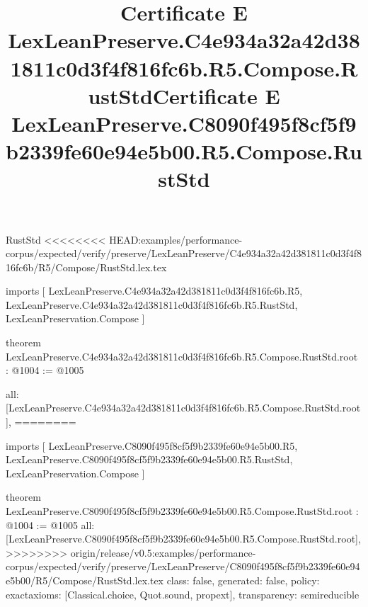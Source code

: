 \begin{lexlean}{RustStd}
<<<<<<<< HEAD:examples/performance-corpus/expected/verify/preserve/LexLeanPreserve/C4e934a32a42d381811c0d3f4f816fc6b/R5/Compose/RustStd.lex.tex
\title{Certificate E LexLeanPreserve.C4e934a32a42d381811c0d3f4f816fc6b.R5.Compose.RustStd}
\begin{coremodule}
imports [
  LexLeanPreserve.C4e934a32a42d381811c0d3f4f816fc6b.R5,
  LexLeanPreserve.C4e934a32a42d381811c0d3f4f816fc6b.R5.RustStd,
  LexLeanPreservation.Compose
]

theorem LexLeanPreserve.C4e934a32a42d381811c0d3f4f816fc6b.R5.Compose.RustStd.root : @1004 := @1005 {
  all: [LexLeanPreserve.C4e934a32a42d381811c0d3f4f816fc6b.R5.Compose.RustStd.root],
========
\title{Certificate E LexLeanPreserve.C8090f495f8cf5f9b2339fe60e94e5b00.R5.Compose.RustStd}
\begin{coremodule}
imports [
  LexLeanPreserve.C8090f495f8cf5f9b2339fe60e94e5b00.R5,
  LexLeanPreserve.C8090f495f8cf5f9b2339fe60e94e5b00.R5.RustStd,
  LexLeanPreservation.Compose
]

theorem LexLeanPreserve.C8090f495f8cf5f9b2339fe60e94e5b00.R5.Compose.RustStd.root : @1004 := @1005 {
  all: [LexLeanPreserve.C8090f495f8cf5f9b2339fe60e94e5b00.R5.Compose.RustStd.root],
>>>>>>>> origin/release/v0.5:examples/performance-corpus/expected/verify/preserve/LexLeanPreserve/C8090f495f8cf5f9b2339fe60e94e5b00/R5/Compose/RustStd.lex.tex
  class: false,
  generated: false,
  policy: exact{axioms: [Classical.choice, Quot.sound, propext]},
  transparency: semireducible
}


\end{coremodule}}
\end{coremodule}
\end{lexlean}
